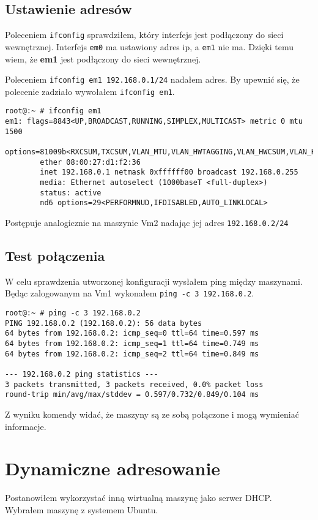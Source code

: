 \documentclass{mwart} %
\begin{document}
\subsection{Ustawienie adresów}
Poleceniem \texttt{ifconfig} sprawdziłem, który interfejs jest podłączony do sieci wewnętrznej. Interfejs \texttt{em0} ma ustawiony adres ip, a \texttt{em1} nie ma. Dzięki temu wiem, że \textbf{em1} jest podłączony do sieci wewnętrznej.

Poleceniem \texttt{ifconfig em1 192.168.0.1/24} nadałem adres. By upewnić się, że polecenie zadziało wywołałem \texttt{ifconfig em1}.

\begin{verbatim}
root@:~ # ifconfig em1
em1: flags=8843<UP,BROADCAST,RUNNING,SIMPLEX,MULTICAST> metric 0 mtu 1500
        options=81009b<RXCSUM,TXCSUM,VLAN_MTU,VLAN_HWTAGGING,VLAN_HWCSUM,VLAN_HWFILTER>
        ether 08:00:27:d1:f2:36
        inet 192.168.0.1 netmask 0xffffff00 broadcast 192.168.0.255
        media: Ethernet autoselect (1000baseT <full-duplex>)
        status: active
        nd6 options=29<PERFORMNUD,IFDISABLED,AUTO_LINKLOCAL>
\end{verbatim}

Postępuje analogicznie na maszynie Vm2 nadając jej adres \texttt{192.168.0.2/24}

\subsection{Test połączenia}
W celu sprawdzenia utworzonej konfiguracji wysłałem ping między maszynami. Będąc zalogowanym na Vm1 wykonałem \texttt{ping -c 3 192.168.0.2}.

\begin{verbatim}
root@:~ # ping -c 3 192.168.0.2
PING 192.168.0.2 (192.168.0.2): 56 data bytes
64 bytes from 192.168.0.2: icmp_seq=0 ttl=64 time=0.597 ms
64 bytes from 192.168.0.2: icmp_seq=1 ttl=64 time=0.749 ms
64 bytes from 192.168.0.2: icmp_seq=2 ttl=64 time=0.849 ms

--- 192.168.0.2 ping statistics ---
3 packets transmitted, 3 packets received, 0.0% packet loss
round-trip min/avg/max/stddev = 0.597/0.732/0.849/0.104 ms
\end{verbatim}

Z wyniku komendy widać, że maszyny są ze sobą połączone i mogą wymieniać informacje.

\section{Dynamiczne adresowanie}
Postanowiłem wykorzystać inną wirtualną maszynę jako serwer DHCP. Wybrałem maszynę z systemem Ubuntu.
\end{document}
